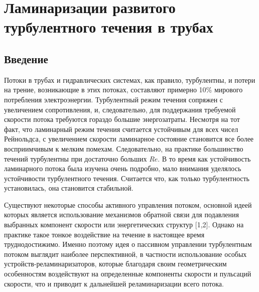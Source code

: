 \chapter{Ламинаризации развитого турбулентного течения в трубах}\label{ch:ch3}
%
\section{Введение}\label{ch3:intro}
%
Потоки в трубах и гидравлических системах, как правило, турбулентны, и потери на трение, возникающие в этих потоках, составляют примерно 10\% мирового потребления электроэнергии. 
%
Турбулентный режим течения сопряжен с увеличением сопротивления, и, следовательно, для поддержания требуемой скорости потока требуются гораздо большие энергозатраты. 
%
Несмотря на тот факт, что ламинарный режим течения считается устойчивым для всех чисел Рейнольдса, с увеличением скорости ламинарное состояние становится все более восприимчивым к мелким помехам. 
%
Следовательно, на практике большинство течений турбулентны при достаточно больших $Re$. 
%
В то время как устойчивость ламинарного потока была изучена очень подробно, мало внимания уделялось устойчивости турбулентного течения. 
%
Считается что, как только турбулентность установилась, она становится стабильной.
%


Существуют некоторые способы активного управления потоком, основной идеей которых является использование механизмов обратной связи для подавления выбранных компонент скорости или энергетических структур [1,2]. 
%
Однако на практике такое тонкое воздействие на течение в настоящее время труднодостижимо. 
%
Именно поэтому идея о пассивном управлении турбулентным потоком выглядит наиболее перспективной, в частности использование особых устройств-реламинаризаторов, 
которые благодаря своим геометрическим особенностям воздействуют на определенные компоненты скорости и пульсаций скорости, что и приводит к дальнейшей реламинаризации всего потока.


